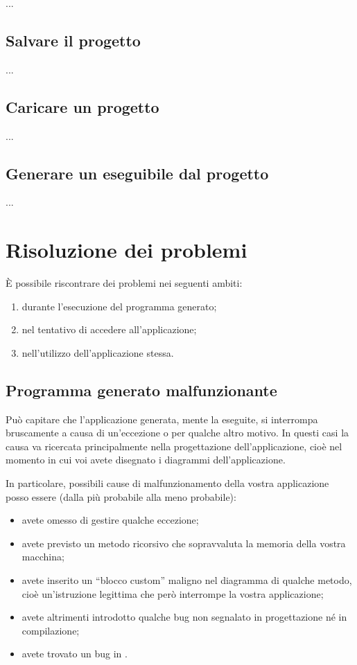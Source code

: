 ...


\subsection{Salvare il progetto}

...


\subsection{Caricare un progetto}

...


\subsection{Generare un eseguibile dal progetto}

...






\section{Risoluzione dei problemi}

È possibile riscontrare dei problemi nei seguenti ambiti:
\begin{enumerate}
	\item durante l'esecuzione del programma generato;
	\item nel tentativo di accedere all'applicazione;
	\item nell'utilizzo dell'applicazione stessa.
\end{enumerate}


\subsection{Programma generato malfunzionante}

Può capitare che l'applicazione generata, mente la eseguite, si interrompa bruscamente a causa di un'eccezione o per qualche altro motivo. In questi casi la causa va ricercata principalmente nella progettazione dell'applicazione, cioè nel momento in cui voi avete disegnato i diagrammi dell'applicazione.

In particolare, possibili cause di malfunzionamento della vostra applicazione posso essere (dalla più probabile alla meno probabile):
\begin{itemize}
	\item avete omesso di gestire qualche eccezione;
	\item avete previsto un metodo ricorsivo che sopravvaluta la memoria della vostra macchina;
	\item avete inserito un “blocco custom” maligno nel diagramma di qualche metodo, cioè un'istruzione legittima che però interrompe la vostra applicazione;
	\item avete altrimenti introdotto qualche bug non segnalato in progettazione né in compilazione;
	\item avete trovato un bug in \proj.
\end{itemize}


